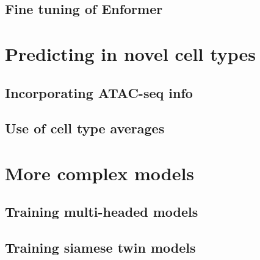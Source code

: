 \documentclass[
]{book}
\begin{document}
\chapter{Fine tuning of Enformer}\label{fine-tuning-of-enformer}

\part{Predicting in novel cell types}\label{part-predicting-in-novel-cell-types}

\chapter{Incorporating ATAC-seq info}\label{incorporating-atac-seq-info}

\chapter{Use of cell type averages}\label{use-of-cell-type-averages}

\part{More complex models}\label{part-more-complex-models}

\chapter{Training multi-headed models}\label{training-multi-headed-models}

\chapter{Training siamese twin models}\label{training-siamese-twin-models}

  
\end{document}
